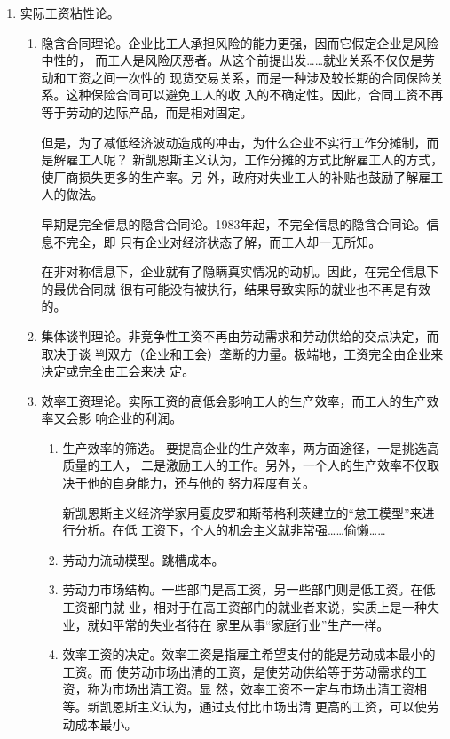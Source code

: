 \begin{enumerate}
\item 实际工资粘性论。

  \begin{enumerate}
  \item 隐含合同理论。企业比工人承担风险的能力更强，因而它假定企业是风险中性的，
    而工人是风险厌恶者。从这个前提出发……就业关系不仅仅是劳动和工资之间一次性的
    现货交易关系，而是一种涉及较长期的合同保险关系。这种保险合同可以避免工人的收
    入的不确定性。因此，合同工资不再等于劳动的边际产品，而是相对固定。

    但是，为了减低经济波动造成的冲击，为什么企业不实行工作分摊制，而是解雇工人呢？
    新凯恩斯主义认为，工作分摊的方式比解雇工人的方式，使厂商损失更多的生产率。另
    外，政府对失业工人的补贴也鼓励了解雇工人的做法。

    早期是完全信息的隐含合同论。1983年起，不完全信息的隐含合同论。信息不完全，即
    只有企业对经济状态了解，而工人却一无所知。

    在非对称信息下，企业就有了隐瞒真实情况的动机。因此，在完全信息下的最优合同就
    很有可能没有被执行，结果导致实际的就业也不再是有效的。


  \item 集体谈判理论。非竞争性工资不再由劳动需求和劳动供给的交点决定，而取决于谈
    判双方（企业和工会）垄断的力量。极端地，工资完全由企业来决定或完全由工会来决
    定。

  \item 效率工资理论。实际工资的高低会影响工人的生产效率，而工人的生产效率又会影
    响企业的利润。

    \begin{enumerate}
    \item 生产效率的筛选。 要提高企业的生产效率，两方面途径，一是挑选高质量的工人，
      二是激励工人的工作。另外，一个人的生产效率不仅取决于他的自身能力，还与他的
      努力程度有关。

      新凯恩斯主义经济学家用夏皮罗和斯蒂格利茨建立的“怠工模型”来进行分析。在低
      工资下，个人的机会主义就非常强……偷懒……

    \item 劳动力流动模型。跳槽成本。


    \item 劳动力市场结构。一些部门是高工资，另一些部门则是低工资。在低工资部门就
      业，相对于在高工资部门的就业者来说，实质上是一种失业，就如平常的失业者待在
      家里从事“家庭行业”生产一样。


    \item  效率工资的决定。效率工资是指雇主希望支付的能是劳动成本最小的工资。而
      使劳动市场出清的工资，是使劳动供给等于劳动需求的工资，称为市场出清工资。显
      然，效率工资不一定与市场出清工资相等。新凯恩斯主义认为，通过支付比市场出清
      更高的工资，可以使劳动成本最小。


\end{enumerate}
\end{enumerate}
\end{enumerate}

